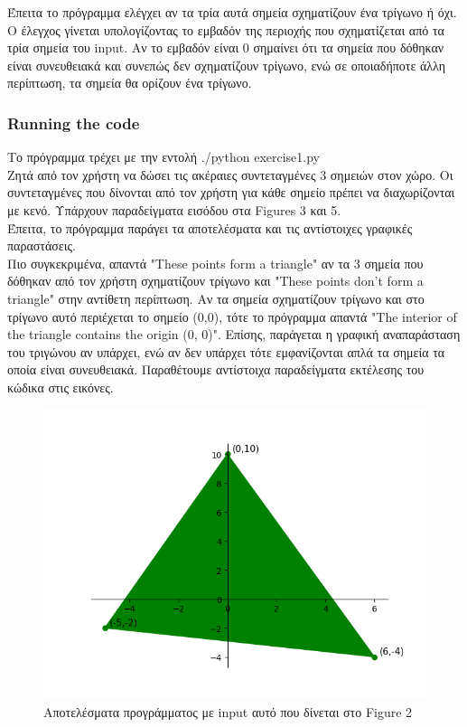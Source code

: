 \documentclass[12pt]{article}
\newenvironment{matlab}
	{\begin{figure}[H]\centering\captionsetup{justification=centering}}
	{\end{figure}}
\begin{document}
Έπειτα το πρόγραμμα ελέγχει αν τα τρία αυτά σημεία σχηματίζουν ένα τρίγωνο ή όχι. Ο έλεγχος γίνεται υπολογίζοντας το εμβαδόν της περιοχής που σχηματίζεται από τα τρία σημεία του input. Αν το εμβαδόν είναι 0 σημαίνει ότι τα σημεία που δόθηκαν είναι συνευθειακά και συνεπώς δεν σχηματίζουν τρίγωνο, ενώ σε οποιαδήποτε άλλη περίπτωση, τα σημεία θα ορίζουν ένα τρίγωνο. \\

\subsubsection*{Running the code}

Το πρόγραμμα τρέχει με την εντολή ./python exercise1.py \\

Ζητά από τον χρήστη να δώσει τις ακέραιες συντεταγμένες 3 σημειών στον χώρο. Οι συντεταγμένες που δίνονται από τον χρήστη για κάθε σημείο πρέπει να διαχωρίζονται με κενό. Υπάρχουν παραδείγματα εισόδου στα Figures 3 και 5. \\

Έπειτα, το πρόγραμμα παράγει τα αποτελέσματα και τις αντίστοιχες γραφικές παραστάσεις. \\

Πιο συγκεκριμένα, απαντά "These points form a triangle" αν τα 3 σημεία που δόθηκαν από τον χρήστη σχηματίζουν τρίγωνο και "These points don't form a triangle" στην αντίθετη περίπτωση. Αν τα σημεία σχηματίζουν τρίγωνο και στο τρίγωνο αυτό περιέχεται το σημείο (0,0), τότε το πρόγραμμα απαντά "The interior of the triangle contains the origin (0, 0)". Επίσης, παράγεται η γραφική αναπαράσταση του τριγώνου αν υπάρχει, ενώ αν δεν υπάρχει τότε εμφανίζονται απλά τα σημεία τα οποία είναι συνευθειακά. Παραθέτουμε αντίστοιχα παραδείγματα εκτέλεσης του κώδικα στις εικόνες. \\

\begin{matlab}
	\includegraphics[scale=0.8]{images/exercise1_1.png}
	\caption{Αποτελέσματα προγράμματος με input αυτό που δίνεται στο Figure 2}
\end{matlab}
\end{document}
